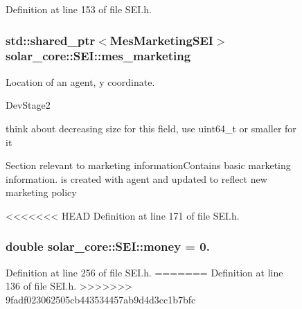 \begin{figure}[H]
\begin{center}
Definition at line 153 of file S\+E\+I.\+h.

\hypertarget{classsolar__core_1_1_s_e_i_ad5326c45ccd4a5512a6c0a296656264d}{}
\subsubsection[{mes\+\_\+marketing}]{\setlength{\rightskip}{0pt plus 5cm}std\+::shared\+\_\+ptr$<${\bf Mes\+Marketing\+S\+E\+I}$>$ solar\+\_\+core\+::\+S\+E\+I\+::mes\+\_\+marketing\hspace{0.3cm}{\ttfamily [protected]}}\label{classsolar__core_1_1_s_e_i_ad5326c45ccd4a5512a6c0a296656264d}
Location of an agent, y coordinate.\begin{DoxyRefDesc}{Dev\+Stage2}
\item[\hyperlink{_dev_stage2__DevStage2000020}{Dev\+Stage2}]think about decreasing size for this field, use uint64\+\_\+t or smaller for it \end{DoxyRefDesc}


Section relevant to marketing information\+Contains basic marketing information. is created with agent and updated to reflect new marketing policy 

<<<<<<< HEAD
Definition at line 171 of file S\+E\+I.\+h.

\hypertarget{classsolar__core_1_1_s_e_i_a8ab5ab03ef726a3354b7c0e0d18da82a}{}
\subsubsection[{money}]{\setlength{\rightskip}{0pt plus 5cm}double solar\+\_\+core\+::\+S\+E\+I\+::money = 0.\hspace{0.3cm}{\ttfamily [protected]}}\label{classsolar__core_1_1_s_e_i_a8ab5ab03ef726a3354b7c0e0d18da82a}


Definition at line 256 of file S\+E\+I.\+h.
=======
Definition at line 136 of file S\+E\+I.\+h.
>>>>>>> 9fadf023062505cb443534457ab9d4d3cc1b7bfc

\hypertarget{classsolar__core_1_1_s_e_i_a811b998092171224983f9aefaa974707}{}

\end{center}
\end{figure}
